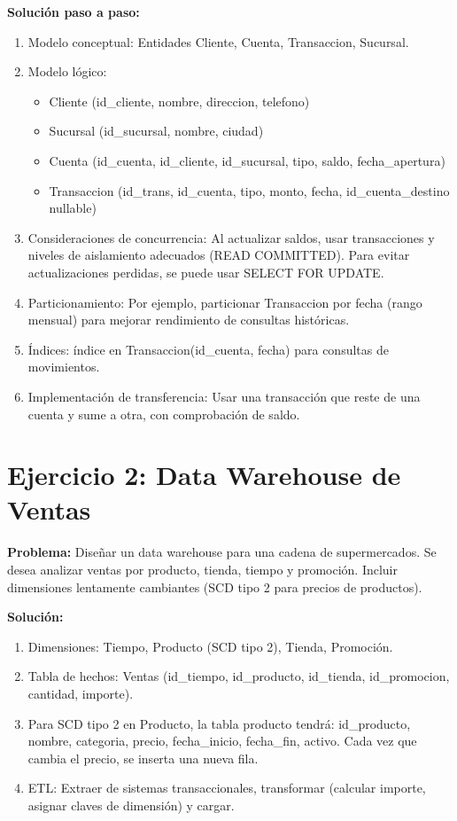 \documentclass[12pt,a4paper,openany,oneside]{book}
\begin{document}
\textbf{Solución paso a paso:}
\begin{enumerate}
    \item Modelo conceptual: Entidades Cliente, Cuenta, Transaccion, Sucursal.
    \item Modelo lógico:
        \begin{itemize}
            \item Cliente (id\_cliente, nombre, direccion, telefono)
            \item Sucursal (id\_sucursal, nombre, ciudad)
            \item Cuenta (id\_cuenta, id\_cliente, id\_sucursal, tipo, saldo, fecha\_apertura)
            \item Transaccion (id\_trans, id\_cuenta, tipo, monto, fecha, id\_cuenta\_destino nullable)
        \end{itemize}
    \item Consideraciones de concurrencia: Al actualizar saldos, usar transacciones y niveles de aislamiento adecuados (READ COMMITTED). Para evitar actualizaciones perdidas, se puede usar SELECT FOR UPDATE.
    \item Particionamiento: Por ejemplo, particionar Transaccion por fecha (rango mensual) para mejorar rendimiento de consultas históricas.
    \item Índices: índice en Transaccion(id\_cuenta, fecha) para consultas de movimientos.
    \item Implementación de transferencia: Usar una transacción que reste de una cuenta y sume a otra, con comprobación de saldo.
\end{enumerate}

\section{Ejercicio 2: Data Warehouse de Ventas}
\textbf{Problema:} Diseñar un data warehouse para una cadena de supermercados. Se desea analizar ventas por producto, tienda, tiempo y promoción. Incluir dimensiones lentamente cambiantes (SCD tipo 2 para precios de productos).

\textbf{Solución:}
\begin{enumerate}
    \item Dimensiones: Tiempo, Producto (SCD tipo 2), Tienda, Promoción.
    \item Tabla de hechos: Ventas (id\_tiempo, id\_producto, id\_tienda, id\_promocion, cantidad, importe).
    \item Para SCD tipo 2 en Producto, la tabla producto tendrá: id\_producto, nombre, categoria, precio, fecha\_inicio, fecha\_fin, activo. Cada vez que cambia el precio, se inserta una nueva fila.
    \item ETL: Extraer de sistemas transaccionales, transformar (calcular importe, asignar claves de dimensión) y cargar.
\end{enumerate}
\end{document}
